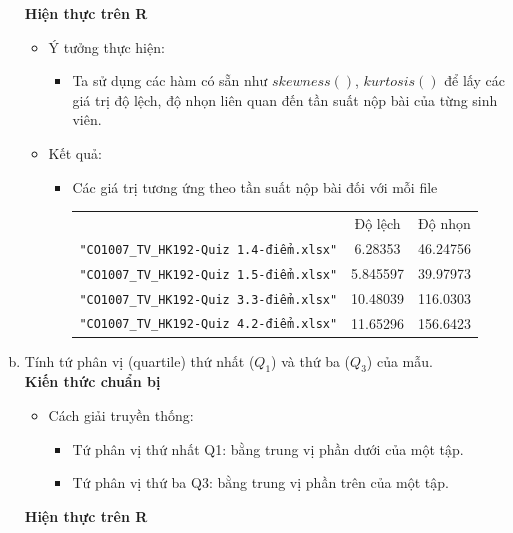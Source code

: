 \documentclass[a4paper]{article}
\theoremstyle{definition}
\begin{document}
\begin{enumerate}[a)]
    \bf Hiện thực trên R\normalfont
    \begin{itemize}
        \item Ý tưởng thực hiện:
        \begin{itemize}
            \item Ta sử dụng các hàm có sẵn như $skewness()$, $kurtosis()$ để lấy các giá trị độ lệch, độ nhọn liên quan đến tần suất nộp bài của từng sinh viên.
        \end{itemize}
        \item Kết quả:
        \begin{itemize}
            \item Các giá trị tương ứng theo tần suất nộp bài đối với mỗi file
            \begin{center}
                \begin{tabular}{l c c}
                      & Độ lệch & Độ nhọn\\
                     \texttt{"CO1007\_TV\_HK192-Quiz 1.4-điểm.xlsx"} & 6.28353 & 46.24756\\ 
                     \texttt{"CO1007\_TV\_HK192-Quiz 1.5-điểm.xlsx"} & 5.845597 & 39.97973\\ 
                     \texttt{"CO1007\_TV\_HK192-Quiz 3.3-điểm.xlsx"} & 10.48039 & 116.0303\\ 
                     \texttt{"CO1007\_TV\_HK192-Quiz 4.2-điểm.xlsx"} & 11.65296 & 156.6423\\ 
                \end{tabular}
            \end{center}
        \end{itemize}
    \end{itemize}
    \bf\item Tính tứ phân vị (quartile) thứ nhất ($Q_1$) và thứ ba ($Q_3$) của mẫu.\\[6pt]
    \bf Kiến thức chuẩn bị\normalfont
    \begin{itemize}
        \item Cách giải truyền thống:
        \begin{itemize}
            \item Tứ phân vị thứ nhất Q1: bằng trung vị phần dưới của một tập.
            \item Tứ phân vị thứ ba Q3: bằng trung vị phần trên của một tập.
        \end{itemize}
    \end{itemize}
    \bf Hiện thực trên R\normalfont
    \begin{itemize}

\end{itemize}
\end{enumerate}
\end{document}

